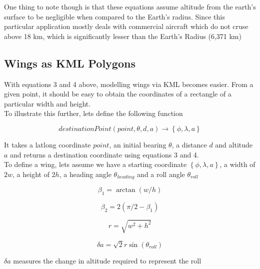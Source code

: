 One thing to note though is that these equations assume altitude from the earth's surface to be negligible when compared to the Earth's radius. Since this particular application mostly deals with commercial aircraft which do not cruse above 18 km, which is significantly lesser than the Earth's Radius (6,371 km)


\subsection{Wings as KML Polygons}

With equations 3 and 4 above, modelling wings via KML becomes easier. From a given point, it should be easy to obtain the coordinates of a rectangle of a particular width and height. \\

To illustrate this further, lets define the following function

\begin{equation}
destinationPoint(point, \theta, d, a) \to \left\{ \phi, \lambda, a \right\}
\end{equation}

 It takes a latlong coordinate $point$, an initial bearing $\theta$, a distance $d$ and altitude $a$ and returns a destination coordinate using equations 3 and 4. \\

To define a wing, lets assume we have a starting coordinate $\left\{\phi, \lambda, a \right\}$, a width of $2w$, a height of $2h$, a heading angle $\theta_{heading}$ and a roll angle $\theta_{roll}$

\begin{equation}
 \beta_{1} = \arctan(w/h)
\end{equation}

\begin{equation}
 \beta_{2} = 2( \pi/2 - \beta_{1})
\end{equation}

\begin{equation}
 r = \sqrt{w^2 + h^2}
\end{equation}

\begin{equation}
\delta a = \sqrt{2} r \sin(\theta_{roll})
\end{equation}

$\delta a$ measures the change in altitude required to represent the roll \\

